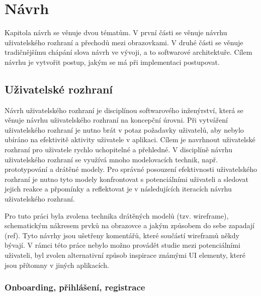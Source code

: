 
\chapter{Návrh}

Kapitola návrh se věnuje dvou tématům. V první části se věnuje návrhu uživatelského rozhraní a přechodů mezi obrazovkami. V druhé části se věnuje tradičnějšímu chápání slova návrh ve vývoji, a to softwarové architektuře. Cílem návrhu je vytvořit postup, jakým se má při implementaci postupovat.

\section{Uživatelské rozhraní}

Návrh uživatelského rozhraní je disciplínou softwarového inženýrství, která se věnuje návrhu uživatelského rozhraní na koncepční úrovni. Při vytváření uživatelského rozhraní je nutno brát v potaz požadavky uživatelů, aby nebylo ubíráno na efektivitě aktivity uživatele v aplikaci. Cílem je navrhnout uživatelské rozhraní pro uživatele rychlo uchopitelné a přehledné. V disciplíně návrhu uživatelského rozhraní se využívá mnoho modelovacích technik, např. prototypování a drátěné modely. Pro správné posouzení efektivnosti uživatelského rozhraní je nutno tyto modely konfrontovat s potenciálními uživateli a sledovat jejich reakce a přpomínky a reflektovat je v následujících iteracích návrhu uživatelského rozhraní. 

Pro tuto práci byla zvolena technika drátěných modelů (tzv. wireframe), schematickým nákresem prvků na obrazovce a jakým způsobem do sebe zapadají (ref). Tyto návrhy jsou ušetřeny komentářů, které součástí wireframů někdy bývají. V rámci této práce nebylo možno provádět studie mezi potenciálními uživateli, byl zvolen alternativní způsob inspirace známými UI elementy, které jsou přítomny v jiných aplikacích. 



\subsection{Onboarding, přihlášení, registrace}

